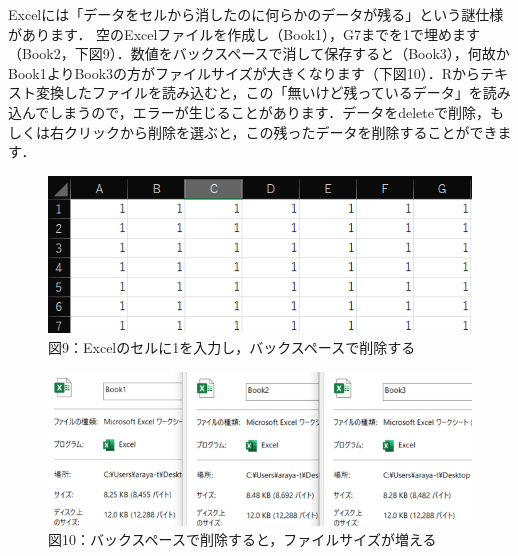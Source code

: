 \documentclass[
  letterpaper,
  DIV=11,
  numbers=noendperiod]{scrreprt}
\begin{document}
\begin{tcolorbox}[enhanced jigsaw, left=2mm, colframe=quarto-callout-tip-color-frame, opacitybacktitle=0.6, colbacktitle=quarto-callout-tip-color!10!white, opacityback=0, leftrule=.75mm, coltitle=black, bottomtitle=1mm, titlerule=0mm, bottomrule=.15mm, rightrule=.15mm, toptitle=1mm, breakable, arc=.35mm, toprule=.15mm, colback=white, title=\textcolor{quarto-callout-tip-color}{\faLightbulb}\hspace{0.5em}{Excelの空欄データ}]

Excelには「データをセルから消したのに何らかのデータが残る」という謎仕様があります．
空のExcelファイルを作成し（Book1），G7までを1で埋めます（Book2，下図9）．数値をバックスペースで消して保存すると（Book3），何故かBook1よりBook3の方がファイルサイズが大きくなります（下図10）．Rからテキスト変換したファイルを読み込むと，この「無いけど残っているデータ」を読み込んでしまうので，エラーが生じることがあります．データをdeleteで削除，もしくは右クリックから削除を選ぶと，この残ったデータを削除することができます．

\end{tcolorbox}

\begin{figure}

{\centering \includegraphics{././image/book2_excel.png}

}

\caption{図9：Excelのセルに1を入力し，バックスペースで削除する}

\end{figure}

\begin{figure}

{\centering \includegraphics{././image/filesize_excel.png}

}

\caption{図10：バックスペースで削除すると，ファイルサイズが増える}

\end{figure}
\end{document}
